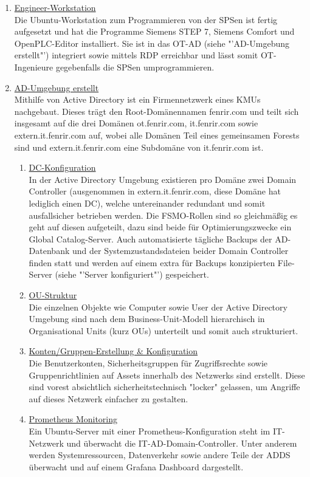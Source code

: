 \documentclass[
	headings=optiontotocandhead,%
	oneside,
	numbers=noenddot,%
	toc=flat, %
	10pt, %
	parskip=full, %
	listof=totoc, %
	listof=flat, %
	numbers=noenddot, %
	bibliography=totoc, %
	a4paper,DIV=14,
]{scrartcl}
\begin{document}
\begin{enumerate}[start=1,label={\bfseries Ziel-H \arabic*},leftmargin=*,wide]
\begin{enumerate}[label=\alph*.]
\item{\underline{Engineer-Workstation}}\\
Die Ubuntu-Workstation zum Programmieren von der SPSen ist fertig aufgesetzt und hat die Programme Siemens STEP 7, Siemens Comfort und OpenPLC-Editor installiert. Sie ist in das OT-AD (siehe "'AD-Umgebung erstellt"') integriert sowie mittels RDP erreichbar und lässt somit OT-Ingenieure gegebenfalls die SPSen umprogrammieren.

\item{\underline{AD-Umgebung erstellt}}\\
Mithilfe von Active Directory ist ein Firmennetzwerk eines KMUs nachgebaut. Dieses trägt den Root-Domänennamen fenrir.com und teilt sich insgesamt auf die drei Domänen ot.fenrir.com, it.fenrir.com sowie extern.it.fenrir.com auf, wobei alle Domänen Teil eines gemeinsamen Forests sind und extern.it.fenrir.com eine Subdomäne von it.fenrir.com ist.

\begin{enumerate}[label=\roman*.]
\item{\underline{DC-Konfiguration}}\\
In der Active Directory Umgebung existieren pro Domäne zwei Domain Controller (ausgenommen in extern.it.fenrir.com, diese Domäne hat lediglich einen DC), welche untereinander redundant und somit ausfallsicher betrieben werden. Die FSMO-Rollen sind so gleichmäßig es geht auf diesen aufgeteilt, dazu sind beide für Optimierungszwecke ein Global Catalog-Server. Auch automatisierte tägliche Backups der AD-Datenbank und der Systemzustandsdateien beider Domain Controller finden statt und werden auf einem extra für Backups konzipierten File-Server (siehe "'Server konfiguriert"') gespeichert.
\item{\underline{OU-Struktur}}\\
Die einzelnen Objekte wie Computer sowie User der Active Directory Umgebung sind nach dem Business-Unit-Modell hierarchisch in Organisational Units (kurz OUs) unterteilt und somit auch strukturiert.
\item{\underline{Konten/Gruppen-Erstellung \& Konfiguration}}\\
Die Benutzerkonten, Sicherheitsgruppen für Zugriffsrechte sowie Gruppenrichtlinien auf Assets innerhalb des Netzwerks sind erstellt. Diese sind vorest absichtlich sicherheitstechnisch "locker" gelassen, um Angriffe auf dieses Netzwerk einfacher zu gestalten.
\item{\underline{Prometheus Monitoring}}\\
Ein Ubuntu-Server mit einer Prometheus-Konfiguration steht im IT-Netzwerk und überwacht die IT-AD-Domain-Controller. Unter anderem werden Systemressourcen, Datenverkehr sowie andere Teile der ADDS überwacht und auf einem Grafana Dashboard dargestellt.
\end{enumerate}


\end{enumerate}
\end{enumerate}
\end{document}
